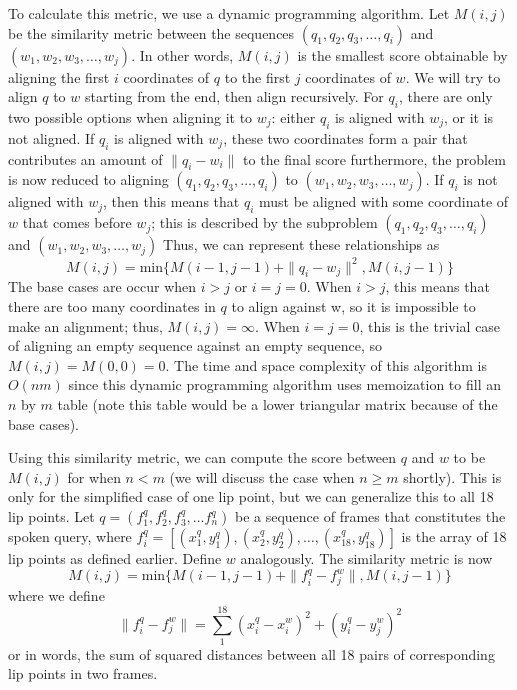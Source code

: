 \documentclass[10pt,twocolumn,letterpaper]{article}
\begin{document}
To calculate this metric, we use a dynamic programming algorithm. Let $M(i,j)$ be the similarity metric between the sequences $(q_1, q_2, q_3, \ldots, q_i)$ and $(w_1, w_2, w_3, \ldots, w_j)$. In other words, $M(i,j)$ is the smallest score obtainable by aligning the first $i$ coordinates of $q$ to the first $j$ coordinates of $w$.  We will try to align $q$ to $w$ starting from the end, then align recursively. For $q_i$, there are only two possible options when aligning it to $w_j$: either $q_i$ is aligned with $w_j$, or it is not aligned. If $q_i$ is aligned with $w_j$, these two coordinates form a pair that contributes an amount of $\|q_i - w_i\|$ to the final score furthermore, the problem is now reduced to aligning $(q_1, q_2, q_3, \ldots, q_i)$ to $(w_1, w_2, w_3, \ldots, w_j)$. If $q_i$ is not aligned with $w_j$, then this means that $q_i$ must be aligned with some coordinate of $w$ that comes before $w_j$; this is described by the subproblem $(q_1, q_2, q_3, \ldots, q_i)$ and $(w_1, w_2, w_3, \ldots, w_j)$ Thus, we can represent these relationships as
\begin{equation}
  M(i,j)=\textrm{min}\{M(i-1,j-1)+\| q_i-w_j \| ^2, M(i,j-1) \}
\end{equation}
The base cases are occur when $i > j$ or $i = j = 0$. When $i > j$, this means that there are too many coordinates in $q$ to align against w, so it is impossible to make an alignment; thus, $M(i, j) = \infty$. When $i = j = 0$, this is the trivial case of aligning an empty sequence against an empty sequence, so $M(i, j) = M(0, 0) = 0$. The time and space complexity of this algorithm is $O(nm)$ since this dynamic programming algorithm uses memoization to fill an $n$ by $m$ table (note this table would be a lower triangular matrix because of the base cases).

Using this similarity metric, we can compute the score between $q$ and $w$ to be $M(i, j)$ for when $n < m$ (we will discuss the case when $n \ge m$ shortly). This is only for the simplified case of one lip point, but we can generalize this to all 18 lip points. Let $q = (f_1^q, f_2^q, f_3^q, \ldots f_n^q)$ be a sequence of frames that constitutes the spoken query, where $f_i^q = [(x_1^q, y_1^q), (x_2^q, y_2^q), \ldots, (x_{18}^q, y_{18}^q)]$ is the array of 18 lip points as defined earlier. Define $w$ analogously. The similarity metric is now
\begin{equation}
  M(i,j)=\textrm{min}\{M(i-1,j-1)+\| f_i^q-f_j^w \|, M(i,j-1) \}
\end{equation}
where we define
\begin{equation}
\| f_i^q-f_j^w \| = \sum_{1}^{18}(x_i^q-x_i^w)^2+(y_i^q-y_j^w)^2
\end{equation}
or in words, the sum of squared distances between all 18 pairs of corresponding lip points in two frames.
\end{document}
